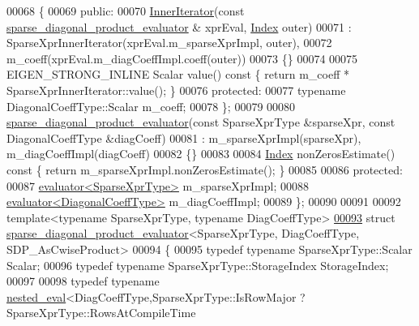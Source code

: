 \begin{DoxyCode}
00068   \{
00069   \textcolor{keyword}{public}:
00070     \hyperlink{class_eigen_1_1_inner_iterator}{InnerIterator}(\textcolor{keyword}{const} \hyperlink{struct_eigen_1_1internal_1_1sparse__diagonal__product__evaluator}{sparse\_diagonal\_product\_evaluator} &
      xprEval, \hyperlink{namespace_eigen_a62e77e0933482dafde8fe197d9a2cfde}{Index} outer)
00071       : SparseXprInnerIterator(xprEval.m\_sparseXprImpl, outer),
00072         m\_coeff(xprEval.m\_diagCoeffImpl.coeff(outer))
00073     \{\}
00074     
00075     EIGEN\_STRONG\_INLINE Scalar value()\textcolor{keyword}{ const }\{ \textcolor{keywordflow}{return} m\_coeff * SparseXprInnerIterator::value(); \}
00076   \textcolor{keyword}{protected}:
00077     \textcolor{keyword}{typename} DiagonalCoeffType::Scalar m\_coeff;
00078   \};
00079   
00080   \hyperlink{struct_eigen_1_1internal_1_1sparse__diagonal__product__evaluator}{sparse\_diagonal\_product\_evaluator}(\textcolor{keyword}{const} SparseXprType &sparseXpr, \textcolor{keyword}{const} 
      DiagonalCoeffType &diagCoeff)
00081     : m\_sparseXprImpl(sparseXpr), m\_diagCoeffImpl(diagCoeff)
00082   \{\}
00083 
00084   \hyperlink{namespace_eigen_a62e77e0933482dafde8fe197d9a2cfde}{Index} nonZerosEstimate()\textcolor{keyword}{ const }\{ \textcolor{keywordflow}{return} m\_sparseXprImpl.nonZerosEstimate(); \}
00085     
00086 \textcolor{keyword}{protected}:
00087   \hyperlink{struct_eigen_1_1internal_1_1evaluator}{evaluator<SparseXprType>} m\_sparseXprImpl;
00088   \hyperlink{struct_eigen_1_1internal_1_1evaluator}{evaluator<DiagonalCoeffType>} m\_diagCoeffImpl;
00089 \};
00090 
00091 
00092 \textcolor{keyword}{template}<\textcolor{keyword}{typename} SparseXprType, \textcolor{keyword}{typename} DiagCoeffType>
\hyperlink{struct_eigen_1_1internal_1_1sparse__diagonal__product__evaluator_3_01_sparse_xpr_type_00_01_diag5c533b27b8fe485cf13e7ad699b99003}{00093} \textcolor{keyword}{struct }\hyperlink{struct_eigen_1_1internal_1_1sparse__diagonal__product__evaluator}{sparse\_diagonal\_product\_evaluator}<SparseXprType, DiagCoeffType, 
      SDP\_AsCwiseProduct>
00094 \{
00095   \textcolor{keyword}{typedef} \textcolor{keyword}{typename} SparseXprType::Scalar Scalar;
00096   \textcolor{keyword}{typedef} \textcolor{keyword}{typename} SparseXprType::StorageIndex StorageIndex;
00097   
00098   \textcolor{keyword}{typedef} \textcolor{keyword}{typename} \hyperlink{struct_eigen_1_1internal_1_1nested__eval}{nested\_eval}<DiagCoeffType,SparseXprType::IsRowMajor ? 
      SparseXprType::RowsAtCompileTime

\end{DoxyCode}
